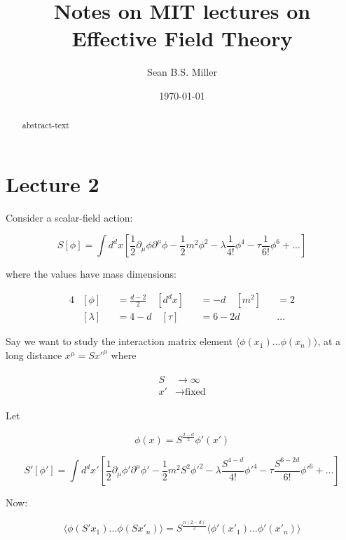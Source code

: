 \documentclass[10pt]{article}
\author{Sean B.S. Miller}
\date{\today}
\title{Notes on MIT lectures on\\ Effective Field Theory}
\begin{document}
	\maketitle
	\begin{abstract}
		abstract-text
	\end{abstract}
	\section{Lecture 2}
	Consider a scalar-field action:
	
	\begin{equation}
		S[\phi] = \int d^dx\left[ \frac{1}{2}\partial_\mu\phi\partial^\mu\phi - \frac{1}{2}m^2\phi^2 - \lambda\frac{1}{4!}\phi^4 - \tau\frac{1}{6!}\phi^6 + \ldots\right]
	\end{equation}
	
	where the values have mass dimensions:
	
	\begin{alignat}{4}
		& [\phi] &&= \frac{d-2}{2} \quad [d^dx] &&= -d \quad [m^2] &&= 2 \\
		& [\lambda] &&= 4-d \quad [\tau] &&= 6-2d \quad &&\ldots
	\end{alignat}
	
	Say we want to study the interaction matrix element $\langle\phi(x_1)\ldots\phi(x_n)\rangle$, at a long distance $x^\mu = Sx'^\mu$ where
	
	\begin{align}
		\begin{split}
		S&\rightarrow\infty \\
		x'&\rightarrow \text{fixed}
		\end{split}
	\end{align}
	
	Let
	
	\begin{equation}
		\phi(x) = S^{\frac{2-d}{2}}\phi'(x')
	\end{equation}
	
	\begin{equation}
		S'[\phi'] = \int d^dx'\left[ \frac{1}{2}\partial_\mu\phi'\partial^\mu\phi' - \frac{1}{2}m^2S^2\phi'^2 - \lambda\frac{S^{4-d}}{4!}\phi'^4 - \tau\frac{S^{6-2d}}{6!}\phi'^6 + \ldots\right]
	\end{equation}
	
	Now:
	
	\begin{equation}
		\langle\phi(S'x_1)\ldots\phi(Sx'_n)\rangle = S^{\frac{n(2-d)}{2}}\langle\phi'(x'_1)\ldots\phi'(x'_n)\rangle
	\end{equation}
	
\end{document}
